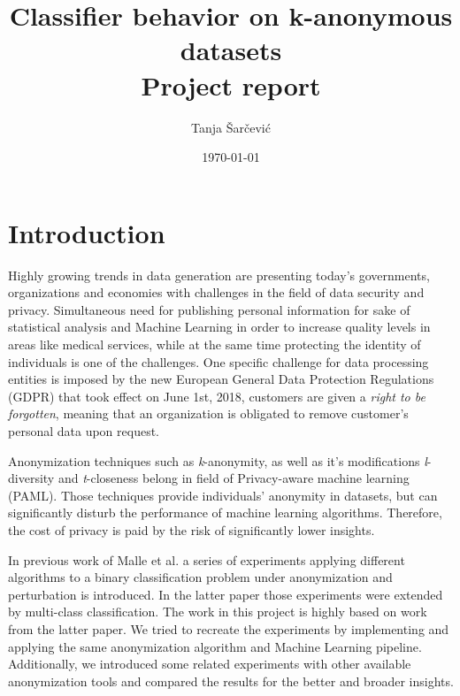 \documentclass{article}
\begin{document}
\author{Tanja Šarčević}
\title{Classifier behavior on k-anonymous datasets \\ 
	 \large Project report}
\date{\today{}}
\maketitle{} %

\section{Introduction}
Highly growing trends in data generation are presenting today's governments, organizations and economies with challenges in the field of data security and privacy. Simultaneous need for publishing personal information for sake of statistical analysis and Machine Learning in order to increase quality levels in areas like medical services, while at the same time protecting the identity of individuals is one of the challenges. One specific challenge for data processing entities is imposed by the new European General Data Protection Regulations (GDPR) that took effect on June 1st, 2018, customers are given a \textit{right to be forgotten}, meaning that an organization is obligated to remove customer's personal data upon request. 

Anonymization techniques such as \textit{k}-anonymity, as well as it's modifications \textit{l}-diversity and \textit{t}-closeness belong in field of Privacy-aware machine learning (PAML). Those techniques provide individuals' anonymity in datasets, but can significantly disturb the performance of machine learning algorithms. Therefore, the cost of privacy is paid by the risk of significantly lower insights. 

In previous work of Malle et al. \cite{malle2016right} a series of experiments applying different algorithms to a binary classification problem under anonymization and perturbation is introduced. In the latter paper \cite{malle2017not} those experiments were extended by multi-class classification. The work in this project is highly based on work from the latter paper. We tried to recreate the experiments by implementing and applying the same anonymization algorithm and Machine Learning pipeline. Additionally, we introduced some related experiments with other available anonymization tools and compared the results for the better and broader insights.
\newpage
\end{document}
